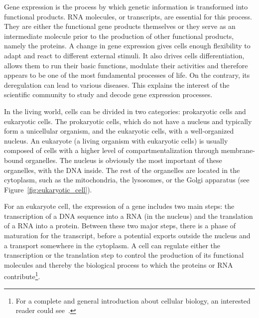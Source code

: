 Gene expression is the process by which genetic information is transformed into functional products.
\ac{RNA} molecules, or transcripts, are essential for this process.
They are either the functional gene products themselves or they serve as an intermediate molecule prior to the production of other functional products, namely the proteins.
A change in gene expression gives cells enough flexibility to adapt and react to different external stimuli.
It also drives cells differentiation, allows them to run their basic functions, modulate their activities and therefore appears to be one of the most fundamental processes of life.
On the contrary, its deregulation can lead to various diseases.
This explains the interest of the scientific community to study and decode gene expression processes.

In the living world, cells can be divided in two categories: prokaryotic cells and eukaryotic cells.
The prokaryotic cells, which do not have a nucleus and typically form a unicellular organism, and the eukaryotic cells, with a well-organized nucleus.
An eukaryote (a living organism with eukaryotic cells) is usually composed of cells with a higher level of compartmentalization through membrane-bound organelles.
The nucleus is obviously the most important of these organelles, with the \ac{DNA} inside.
The rest of the organelles are located in the cytoplasm, such as the mitochondria, the lysosomes, or the Golgi apparatus (see Figure~\ref{fig:eukaryotic_cell}).

For an eukaryote cell, the expression of a gene includes two main steps: the transcription of a \ac{DNA} sequence into a \ac{RNA} (in the nucleus) and the translation of a \ac{RNA} into a protein.
Between these two major steps, there is a phase of maturation for the transcript, before a potential exports outside the nucleus and a transport somewhere in the cytoplasm.
A cell can regulate either the transcription or the translation step to control the production of its functional molecules and thereby the biological process to which the proteins or \ac{RNA} contribute\footnote{For a complete and general introduction about cellular biology, an interested reader could see~\cite{alberts_molecular_2017}.}.

